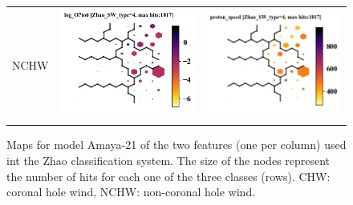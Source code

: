 \documentclass[utf8]{frontiersSCNS} %
\begin{document}
\begin{figure}[h!]
\begin{tabular}{m{1cm}CC}
		NCHW & \includegraphics[width=6cm]{Amaya/SWtype-Zhao_SW_type-4-log_O7to6} &
		\includegraphics[width=6cm]{Amaya/SWtype-Zhao_SW_type-4-proton_speed}\hfill \\
	\end{tabular}
	\caption{Maps for model Amaya-21 of the two features (one per column) used int the Zhao classification system. The size of the nodes represent the number of hits for each one of the three classes (rows). CHW: coronal hole wind, NCHW: non-coronal hole wind.}\label{fig:SWtypeZ}
\end{figure}
\end{document}
